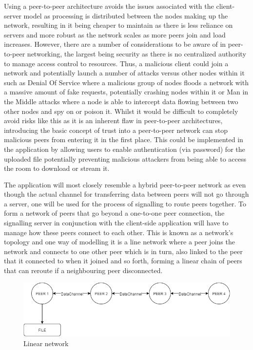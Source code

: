 \documentclass[]{report}
\begin{document}
	Using a peer-to-peer architecture avoids the issues associated with the client-server model as processing is distributed between the nodes making up the network, resulting in it being cheaper to maintain as there is less reliance on servers and more robust as the network scales as more peers join and load increases. However, there are a number of considerations to be aware of in peer-to-peer networking, the largest being security as there is no centralized authority to manage access control to resources. Thus, a malicious client could join a network and potentially launch a number of attacks versus other nodes within it such as Denial Of Service where a malicious group of nodes floods a network with a massive amount of fake requests, potentially crashing nodes within it or Man in the Middle  attacks where a node is able to intercept data flowing between two other nodes and spy on or poison it\cite{P2P Security Issues}. Whilst it would be difficult to completely avoid risks like this as it is an inherent flaw in peer-to-peer architectures, introducing the basic concept of trust into a peer-to-peer network can stop malicious peers from entering it in the first place. This could be implemented in the application by allowing users to enable authentication (via password) for the uploaded file potentially preventing malicious attackers from being able to access the room to download or stream it. 
	
	The application will most closely resemble a hybrid peer-to-peer network as even though the actual channel for transferring data between peers will not go through a server, one will be used for the process of signalling to route peers together. To form a network of peers that go beyond a one-to-one peer connection, the signalling server in conjunction with the client-side application will have to manage how these peers connect to each other. This is known as a network's topology and one way of modelling it is a line network where a peer joins the network and connects to one other peer which is in turn, also linked to the peer that it connected to when it joined and so forth, forming a linear chain of peers that can reroute if a neighbouring peer disconnected.
	
	\begin{figure}[H]
		\centering
		\caption{Linear network}
		\includegraphics[scale=0.4]{network.png}
	\end{figure}
	
\end{document}
